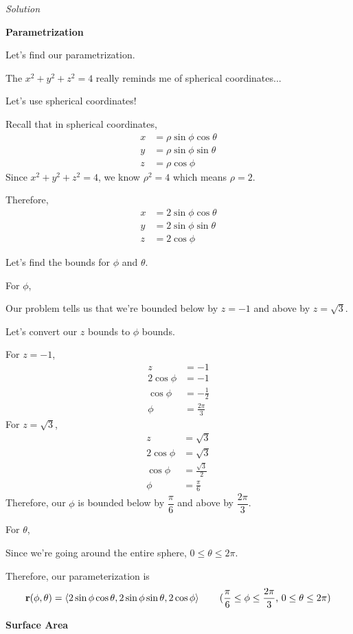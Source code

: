 \documentclass{article}
\newcommand{\lra}[1]{\left\langle #1 \right\rangle}
\renewcommand{\r}[0]{\mathbf{r}}
\newcommand{\Solution}{\textit{Solution}}
\begin{document}
\Solution

{}\textbf{Parametrization}

Let's find our parametrization.

The $x^2+y^2+z^2=4$ really reminds me of spherical coordinates...

Let's use spherical coordinates!

Recall that in spherical coordinates,
\begin{align*}
    x&=\rho\sin\phi\cos\theta\\
    y&=\rho\sin\phi\sin\theta\\
    z&=\rho\cos\phi
\end{align*}
Since $x^2+y^2+z^2=4$, we know $\rho^2=4$ which means $\rho=2$.

Therefore,
\begin{align*}
    x&=2\sin\phi\cos\theta\\
    y&=2\sin\phi\sin\theta\\
    z&=2\cos\phi
\end{align*}

Let's find the bounds for $\phi$ and $\theta$.

For $\phi$,

Our problem tells us that we're bounded below by $z=-1$ and above by $z=\sqrt{3}$.

Let's convert our $z$ bounds to $\phi$ bounds.

For $z=-1$,
\begin{align*}
    z&=-1\\
    2\cos\phi&=-1\\
    \cos\phi&=-\frac{1}{2}\\
    \phi&=\frac{2\pi}{3}
\end{align*}
For $z=\sqrt{3}$,
\begin{align*}
    z&=\sqrt{3}\\
    2\cos\phi&=\sqrt{3}\\
    \cos\phi&=\frac{\sqrt{3}}{2}\\
    \phi&=\frac{\pi}{6}
\end{align*}
Therefore, our $\phi$ is bounded below by $\dfrac{\pi}{6}$ and above by $\dfrac{2\pi}{3}$.

For $\theta$,

Since we're going around the entire sphere, $0\leq \theta\leq 2\pi$.

Therefore, our parameterization is
\begin{equation*}
   \r(\phi,\theta)=\lra{2\sin\phi\cos\theta,2\sin\phi\sin\theta,2\cos\phi}\tag{$\dfrac{\pi}{6}\leq \phi\leq\dfrac{2\pi}{3}$, $0\leq \theta\leq 2\pi$}
\end{equation*}
{}\textbf{Surface Area}
\end{document}
